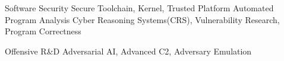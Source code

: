 
\begin{cvskills}
    \cvskill
    {Software Security} %
    {Secure Toolchain, Kernel, Trusted Platform} %
  \cvskill
    {Automated Program Analysis} %
    {Cyber Reasoning Systems(CRS), Vulnerability Research, Program Correctness} %

    \cvskill
    {Offensive R\&D} %
    {Adversarial AI, Advanced C2, Adversary Emulation} %

\end{cvskills}
